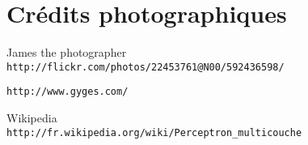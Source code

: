 \chapter{Crédits photographiques}

	\begin{description}[style=nextline]

		\item[Deep blue, Figure \ref{fig:deep_blue}] James the photographer\\
		\texttt{http://flickr.com/photos/22453761@N00/592436598/}

		\item[Plateaux de Gygès] \texttt{http://www.gyges.com/}

		\item[Perceptron multicouche, Figure \ref{fig:perceptron_multi}] Wikipedia\\
		\texttt{http://fr.wikipedia.org/wiki/Perceptron\_multicouche}

	\end{description}

